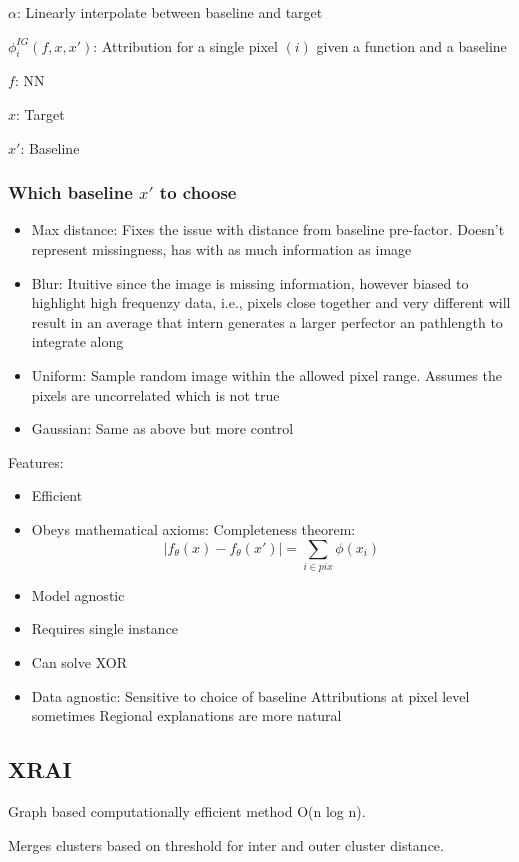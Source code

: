 \(\alpha\): Linearly interpolate between baseline and target

\(\phi_i^{IG}(f,x,x')\): Attribution for a single pixel \((i )\) given a function and a baseline

\(f\): NN 

\(x\): Target

\(x'\): Baseline 

\subsubsection{Which baseline \(x'\) to choose }
\begin{itemize}
    \item Max distance: Fixes the issue with distance from baseline pre-factor. Doesn't represent missingness, has with as much information as image
    \item Blur: Ituitive since the image is missing information, however biased to highlight high frequenzy data, i.e., pixels close together and very different will result in an average that intern generates a larger perfector an pathlength to integrate along
    \item Uniform: Sample random image within the allowed pixel range. Assumes the pixels are uncorrelated which is not true
    \item Gaussian: Same as above but more control
\end{itemize}

Features:
\begin{itemize}
    \item Efficient
    \item Obeys mathematical axioms: Completeness theorem:\[
    |f_\theta(x) - f_\theta(x')| = \sum_{i \in pix} \phi(x_i)
    \]
    \item Model agnostic
    \item Requires single instance
    \item Can solve XOR
    \item Data agnostic:
    \subitem Sensitive to choice of baseline
    \subitem Attributions at pixel level sometimes
    \subitem Regional explanations are more natural
\end{itemize}

\subsection{XRAI}
Graph based computationally efficient method O(n log n).

Merges clusters based on threshold for inter and outer cluster distance.

